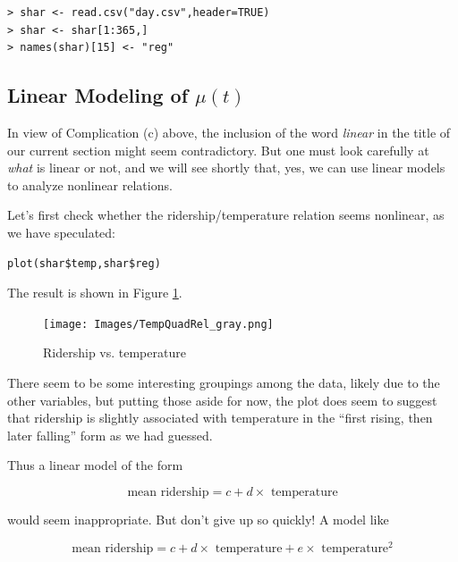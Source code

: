 \begin{lstlisting}
> shar <- read.csv("day.csv",header=TRUE)
> shar <- shar[1:365,]
> names(shar)[15] <- "reg"
\end{lstlisting}

\subsection{Linear Modeling of $\mu(t)$}

In view of Complication (c) above, the inclusion of the word {\it
linear} in the title of our current section might seem contradictory.
But one must look carefully at {\it what} is linear or not, and we will
see shortly that, yes, we can use linear models to analyze nonlinear
relations.  

Let's first check whether the ridership/temperature relation seems
nonlinear, as we have speculated:

\begin{lstlisting}
plot(shar$temp,shar$reg)
\end{lstlisting}

The result is shown in Figure \ref{cntvstemp}.

\begin{figure}
\centerline{
\texttt{[image: Images/TempQuadRel\_gray.png]}
}
\caption{Ridership vs. temperature}
\label{cntvstemp}
\end{figure}

There seem to be some interesting groupings among the data, likely due
to the other variables, but putting those aside for now, the plot does
seem to suggest that ridership is slightly associated with temperature
in the ``first rising, then later falling'' form as we had guessed.

Thus a linear model of the form

\begin{equation}
\label{englishlinearbad}
\textrm{mean ridership} = c + d \times \textrm{ temperature}
\end{equation}

would seem inappropriate.  But don't give up so quickly!  A model like

\begin{equation}
\label{englishlinearquad}
\textrm{mean ridership} = c + d \times \textrm{ temperature}
+ e \times \textrm{ temperature}^2
\end{equation}

